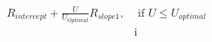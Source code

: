 \documentclass[preview]{standalone}
\begin{document}
\begin{align*}
R_{intercept} +  \frac{U}{U_{Optimal}} R_{slope1}, & \text{   if }  U \leq U_{optimal}  \\[6pt] & \text{i}
\end{align*}
\end{document}
